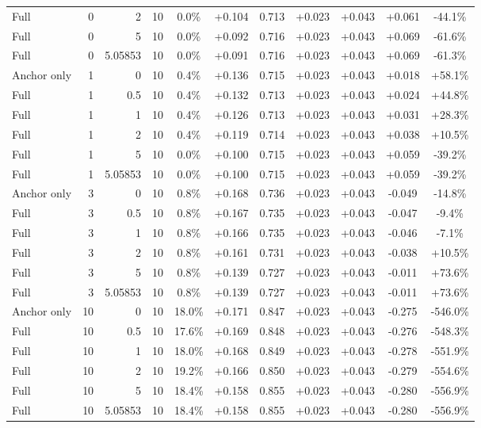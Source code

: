 \begin{table}[htbp]
\begin{tabular}{lrrrccccccc}
Full & 0 & 2 & 10 & 0.0\% & +0.104 & 0.713 & +0.023 & +0.043 & +0.061 & -44.1\% \\
Full & 0 & 5 & 10 & 0.0\% & +0.092 & 0.716 & +0.023 & +0.043 & +0.069 & -61.6\% \\
Full & 0 & 5.05853 & 10 & 0.0\% & +0.091 & 0.716 & +0.023 & +0.043 & +0.069 & -61.3\% \\
Anchor only & 1 & 0 & 10 & 0.4\% & +0.136 & 0.715 & +0.023 & +0.043 & +0.018 & +58.1\% \\
Full & 1 & 0.5 & 10 & 0.4\% & +0.132 & 0.713 & +0.023 & +0.043 & +0.024 & +44.8\% \\
Full & 1 & 1 & 10 & 0.4\% & +0.126 & 0.713 & +0.023 & +0.043 & +0.031 & +28.3\% \\
Full & 1 & 2 & 10 & 0.4\% & +0.119 & 0.714 & +0.023 & +0.043 & +0.038 & +10.5\% \\
Full & 1 & 5 & 10 & 0.0\% & +0.100 & 0.715 & +0.023 & +0.043 & +0.059 & -39.2\% \\
Full & 1 & 5.05853 & 10 & 0.0\% & +0.100 & 0.715 & +0.023 & +0.043 & +0.059 & -39.2\% \\
Anchor only & 3 & 0 & 10 & 0.8\% & +0.168 & 0.736 & +0.023 & +0.043 & -0.049 & -14.8\% \\
Full & 3 & 0.5 & 10 & 0.8\% & +0.167 & 0.735 & +0.023 & +0.043 & -0.047 & -9.4\% \\
Full & 3 & 1 & 10 & 0.8\% & +0.166 & 0.735 & +0.023 & +0.043 & -0.046 & -7.1\% \\
Full & 3 & 2 & 10 & 0.8\% & +0.161 & 0.731 & +0.023 & +0.043 & -0.038 & +10.5\% \\
Full & 3 & 5 & 10 & 0.8\% & +0.139 & 0.727 & +0.023 & +0.043 & -0.011 & +73.6\% \\
Full & 3 & 5.05853 & 10 & 0.8\% & +0.139 & 0.727 & +0.023 & +0.043 & -0.011 & +73.6\% \\
Anchor only & 10 & 0 & 10 & 18.0\% & +0.171 & 0.847 & +0.023 & +0.043 & -0.275 & -546.0\% \\
Full & 10 & 0.5 & 10 & 17.6\% & +0.169 & 0.848 & +0.023 & +0.043 & -0.276 & -548.3\% \\
Full & 10 & 1 & 10 & 18.0\% & +0.168 & 0.849 & +0.023 & +0.043 & -0.278 & -551.9\% \\
Full & 10 & 2 & 10 & 19.2\% & +0.166 & 0.850 & +0.023 & +0.043 & -0.279 & -554.6\% \\
Full & 10 & 5 & 10 & 18.4\% & +0.158 & 0.855 & +0.023 & +0.043 & -0.280 & -556.9\% \\
Full & 10 & 5.05853 & 10 & 18.4\% & +0.158 & 0.855 & +0.023 & +0.043 & -0.280 & -556.9\% \\

\end{tabular}
\end{table}
